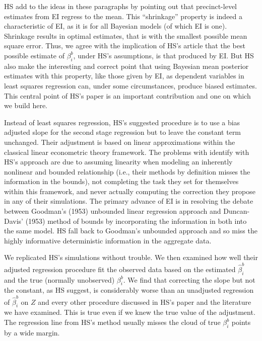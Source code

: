 \documentclass[11pt,titlepage]{article}
\begin{document}
HS add to the ideas in these paragraphs by pointing out that
precinct-level estimates from EI regress to the mean.  This
``shrinkage'' property is indeed a characteristic of EI, as it is for
all Bayesian models (of which EI is one).  Shrinkage results in
optimal estimates, that is with the smallest possible mean square
error.  Thus, we agree with the implication of HS's article that the
best possible estimate of $\beta^b_i$, under HS's assumptions, is that
produced by EI.  But HS also make the interesting and correct point
that using Bayesian mean posterior estimates with this property, like
those given by EI, as dependent variables in least squares regression
can, under some circumstances, produce biased estimates.  This central
point of HS's paper is an important contribution and one on which we
build here.

Instead of least squares regression, HS's suggested procedure is to
use a bias adjusted slope for the second stage regression but to leave
the constant term unchanged.  Their adjustment is based on linear
approximations within the classical linear econometric theory
framework.  The problems with identify with HS's approach are due to
assuming linearity when modeling an inherently nonlinear and bounded
relationship (i.e., their methods by definition misses the information
in the bounds), not completing the task they set for themselves within
this framework, and never actually computing the correction they
propose in any of their simulations.  The primary advance of EI is in
resolving the debate between Goodman's (1953) unbounded linear
regression approach and Duncan-Davis' (1953) method of bounds by
incorporating the information in both into the same model.  HS fall
back to Goodman's unbounded approach and so miss the highly
informative deterministic information in the aggregate data.

We replicated HS's simulations without trouble.  We then examined how
well their adjusted regression procedure fit the observed data based
on the estimated $\hat\beta_i^b$ and the true (normally unobserved)
$\beta_i^b$.  We find that correcting the slope but not the constant,
as HS suggest, is considerably worse than an unadjusted regression of
$\hat\beta_i^b$ on $Z$ and every other procedure discussed in HS's
paper and the literature we have examined.  This is true even if we
knew the true value of the adjustment.  The regression line from HS's
method usually misses the cloud of true $\beta_i^b$ points by a wide
margin.
\end{document}
